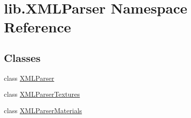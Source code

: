 \hypertarget{namespacelib_1_1_x_m_l_parser}{\section{lib.\-X\-M\-L\-Parser Namespace Reference}
\label{namespacelib_1_1_x_m_l_parser}
}
\subsection*{Classes}
\begin{DoxyCompactItemize}
\item 
class \hyperlink{classlib_1_1_x_m_l_parser_1_1_x_m_l_parser}{X\-M\-L\-Parser}
\item 
class \hyperlink{classlib_1_1_x_m_l_parser_1_1_x_m_l_parser_textures}{X\-M\-L\-Parser\-Textures}
\item 
class \hyperlink{classlib_1_1_x_m_l_parser_1_1_x_m_l_parser_materials}{X\-M\-L\-Parser\-Materials}
\end{DoxyCompactItemize}

